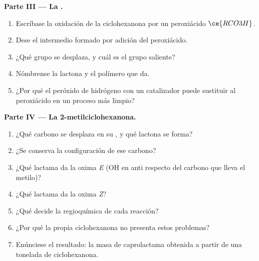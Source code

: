 \begin{problem}
\medskip\noindent\textbf{Parte III --- La .}
\begin{enumerate}[resume]
  \item Escríbase la oxidación de la ciclohexanona por un peroxiácido $\ce{RCO3H}$.
  \item Dese el intermedio formado por adición del peroxiácido.
  \item ¿Qué grupo se desplaza, y cuál es el grupo saliente?
  \item Nómbrense la lactona y el polímero que da.
  \item ¿Por qué el peróxido de hidrógeno con un catalizador puede sustituir al peroxiácido en un
        proceso más limpio?
\end{enumerate}

\medskip\noindent\textbf{Parte IV --- La 2-metilciclohexanona.}
\begin{enumerate}[resume]
  \item ¿Qué carbono se desplaza en su , y qué lactona se forma?
  \item ¿Se conserva la configuración de ese carbono?
  \item ¿Qué lactama da la oxima \textit{E} (OH en anti respecto del carbono que lleva el metilo)?
  \item ¿Qué lactama da la oxima \textit{Z}?
  \item ¿Qué decide la regioquímica de cada reacción?
  \item ¿Por qué la propia ciclohexanona no presenta estos problemas?
  \item Enúnciese el resultado: la masa de caprolactama obtenida a partir de una tonelada de ciclohexanona.
\end{enumerate}
\end{problem}
